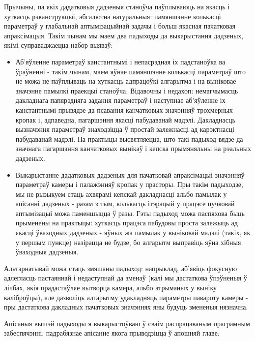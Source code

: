 Прычыны, па якіх дадатковыя дадзеныя станоўча паўплываюць на якасць і хуткасць рэканструкцыі, абсалютна натуральныя:
памяншэнне колькасці параметраў у глабальнай аптымізацыйнай задачы і больш якасная пачатковая апраксімацыя.
Такім чынам мы маем два падыходы да выкарыстання дадзеных, якімі суправаджаецца набор выяваў:
\begin{itemize}
    \item Аб'яўленне параметраў канстантнымі і непасрэдная іх падстаноўка ва ўраўненні - такім чынам,
    маем яўнае памяншэнне колькасці параметраў што не можа не паўплываць на хуткасць адпрацоўкі алгарытма
    і на выніковае значэнне памылкі праекцыі станоўча.
    Відавочны і недахоп: немагчымасць дакладнага папярэдняга задання параметраў і наступнае аб'яўленне іх канстантнымі
    прывядзе да псавання канчатковых значэнняў трохмерных кропак і, адпаведна, пагаршэння якасці пабудаванай мадэлі.
    Дакладнасць вызначэння параметраў знаходзіцца ў простай залежнасці ад карэктнасці пабудаванай мадэлі.
    На практыцы высвятляецца, што такі падыход вядзе да значнага пагаршэння канчатковых вынікаў
    і кепска прымяняльны на рэальных дадзеных.
    \item Выкарыстанне дадатковых дадзеных для пачатковай апраксімацыі значэнняў параметраў камеры і
    палажэнняў кропак у прасторы. Пры такім падыходзе, мы не рызыкуем стаць ахвярамі кепскай дакладнасці
    альбо памылак у апісанні дадзеных - разам з тым, колькасць ітэрацый у працэсе пучковай аптымізацыі
    можа паменшыцца ў разы. Гэты падыход можа паспяхова быць прыменены на практыцы:
    хуткасць працэса пабудовы проста залежыць ад якасці ўваходных дадзеных -
    яўных жа памылак у выніковай мадэлі (такіх, як у першым пункце) назірацца не будзе,
    бо алгарытм выправіць яўна хібныя ўваходныя дадзеныя.
\end{itemize}

Альтэрнатывай можа стаць змяшаны падыход: напрыклад, аб'явіць фокусную адлегласць пастаяннай
і недаступнай да зменаў (калі мы дастаткова ўпэўненыя ў лічбах, якія прадастаўляе вытворца камера,
альбо атрыманых у выніку каліброўцы), але дазволіць алгарытму удакладняць параметры павароту камеры -
пры дастаткова дакладных пачатковых значэннях яны будуць змененыя нязначна.

Апісаныя вышэй падыходы я выкарыстоўваю ў сваім распрацаваным праграмным забеспячэнні,
падрабязнае апісанне якога прыводзіцца ў апошняй главе.

\newpage
